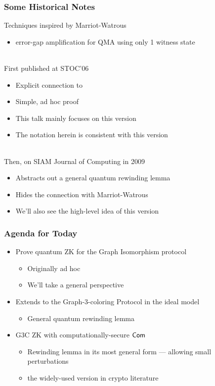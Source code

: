 \documentclass[aspectratio=1610, 12pt, xcolor={dvipsnames}]{beamer}
\begin{document}
\begin{frame}
\frametitle{Some Historical Notes}
Techniques inspired by Marriot-Watrous \cite{DBLP:conf/coco/MarriottW04} 
\begin{itemize}
\item error-gap amplification for QMA using only 1 witness state
\end{itemize}
~\\
First published at STOC'06 \cite{DBLP:conf/stoc/Watrous06}
\begin{itemize}
\item
Explicit connection to \cite{DBLP:conf/coco/MarriottW04}
\item
Simple, ad hoc proof
\item
This talk mainly focuses on this version
\item
The notation herein is consistent with this version
\end{itemize}
~\\
Then, on SIAM Journal of Computing in 2009 \cite{DBLP:journals/siamcomp/Watrous09}
\begin{itemize}
\item
Abstracts out a general quantum rewinding lemma
\item
Hides the connection with Marriot-Watrous
\item
We'll also see the high-level idea of this version 
\end{itemize}
\end{frame}


\begin{frame}
\frametitle{Agenda for Today}
\begin{itemize}
\item
Prove quantum ZK for the Graph Isomorphism protocol \cite{DBLP:conf/focs/GoldreichMW86} 
\begin{itemize}
\item 
Originally ad hoc \cite{DBLP:conf/stoc/Watrous06}
\item
We'll take a general perspective 
\end{itemize}
\item
Extends to the Graph-3-coloring Protocol \cite{DBLP:conf/focs/GoldreichMW86} in the ideal \Com model 
\begin{itemize}
\item
General quantum rewinding lemma
\end{itemize}
\item
G3C ZK with computationally-secure $\mathsf{Com}$ 
\begin{itemize}
\item
Rewinding lemma in its most general form --- allowing small perturbations
\item
the widely-used version in crypto literature
\end{itemize}
\end{itemize}
\end{frame}
\end{document}
